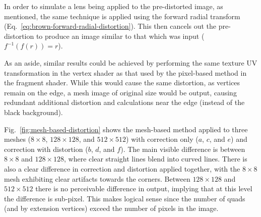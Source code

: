 In order to simulate a lens being applied to the pre-distorted image, as mentioned, the same technique is applied using the forward radial transform (Eq.~\ref{eq:brown-forward-radial-distortion}).
This then cancels out the pre-distortion to produce an image similar to that which was input ($f^{-1}(f(r)) = r$).

As an aside, similar results could be achieved by performing the same texture UV transformation in the vertex shader as that used by the pixel-based method in the fragment shader.
While this would cause the same distortion, as vertices remain on the edge, a mesh image of original size would be output, causing redundant additional distortion and calculations near the edge (instead of the black background).

Fig.~\ref{fig:mesh-based-distortion} shows the mesh-based method applied to three meshes ($8 \times 8$, $128 \times 128$, and $512 \times 512$) with correction only ($a$, $c$, and $e$) and correction with distortion ($b$, $d$, and $f$).
The main visible difference is between $8 \times 8$ and $128 \times 128$, where clear straight lines blend into curved lines.
There is also a clear difference in correction and distortion applied together, with the $8 \times 8$ mesh exhibiting clear artifacts towards the corners.
Between $128 \times 128$ and $512 \times 512$ there is no perceivable difference in output, implying that at this level the difference is sub-pixel.
This makes logical sense since the number of quads (and by extension vertices) exceed the number of pixels in the image.

